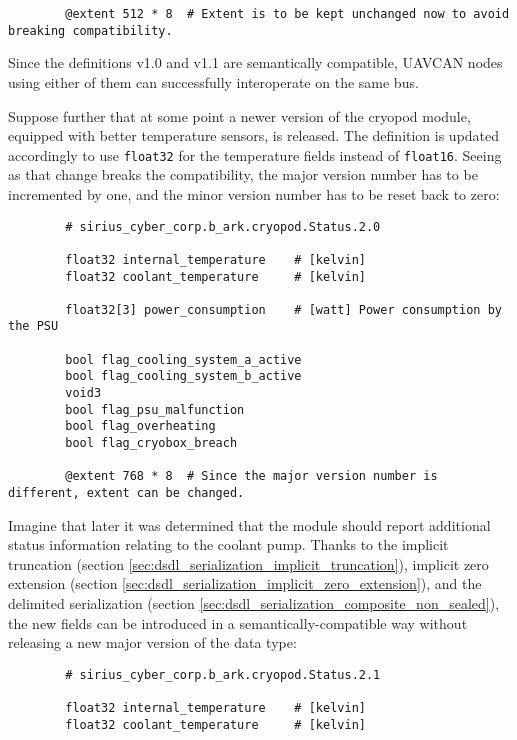 \begin{remark}[breakable]
\begin{verbatim}
        @extent 512 * 8  # Extent is to be kept unchanged now to avoid breaking compatibility.
    \end{verbatim}

    Since the definitions v1.0 and v1.1 are semantically compatible,
    UAVCAN nodes using either of them can successfully interoperate on the same bus.

    Suppose further that at some point a newer version of the cryopod module,
    equipped with better temperature sensors, is released.
    The definition is updated accordingly to use \verb|float32| for the temperature fields instead of \verb|float16|.
    Seeing as that change breaks the compatibility, the major version number has to be incremented by one,
    and the minor version number has to be reset back to zero:

    \begin{verbatim}
        # sirius_cyber_corp.b_ark.cryopod.Status.2.0

        float32 internal_temperature    # [kelvin]
        float32 coolant_temperature     # [kelvin]

        float32[3] power_consumption    # [watt] Power consumption by the PSU

        bool flag_cooling_system_a_active
        bool flag_cooling_system_b_active
        void3
        bool flag_psu_malfunction
        bool flag_overheating
        bool flag_cryobox_breach

        @extent 768 * 8  # Since the major version number is different, extent can be changed.
    \end{verbatim}

    Imagine that later it was determined that the module should report additional status information
    relating to the coolant pump.
    Thanks to the implicit truncation (section \ref{sec:dsdl_serialization_implicit_truncation}),
    implicit zero extension (section \ref{sec:dsdl_serialization_implicit_zero_extension}),
    and the delimited serialization (section \ref{sec:dsdl_serialization_composite_non_sealed}),
    the new fields can be introduced in a semantically-compatible way without releasing
    a new major version of the data type:

    \begin{verbatim}
        # sirius_cyber_corp.b_ark.cryopod.Status.2.1

        float32 internal_temperature    # [kelvin]
        float32 coolant_temperature     # [kelvin]


\end{verbatim}
\end{remark}
